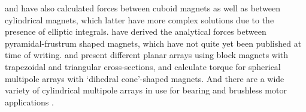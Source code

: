 \textcite{agashe2008-applphys} and \textcite{nagaraj1988} have also calculated forces between cuboid magnets as well as between cylindrical magnets, which latter have more complex solutions due to the presence of elliptic integrals. \textcite{janssen2009-ietm} have derived the analytical forces between pyramidal-frustrum shaped magnets, which have not quite yet been published at time of writing. \textcite{lee2006-mx} and \textcite{cho2001} present different planar arrays using block magnets with trapezoidal and triangular cross-sections, and \textcite{yan2006-iemx} calculate torque for spherical multipole arrays with `dihedral cone'-shaped magnets. And there are a wide variety of cylindrical multipole arrays in use for bearing and brushless motor applications \parencite{zhu2001-ipep}.


